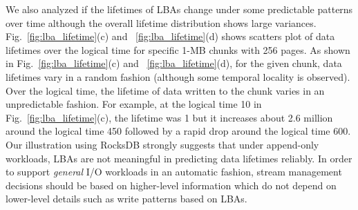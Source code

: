 We also analyzed 
if the lifetimes of LBAs change under some predictable patterns over time 
although the overall lifetime distribution shows large variances.
Fig.~\ref{fig:lba_lifetime}(c) and ~\ref{fig:lba_lifetime}(d) shows
scatters plot of data lifetimes over the logical time 
for specific 1-MB chunks with 256 pages. 
As shown in Fig.~\ref{fig:lba_lifetime}(c) and ~\ref{fig:lba_lifetime}(d), 
for the given chunk, data lifetimes vary in a random fashion
(although some temporal locality is observed).
Over the logical time, the lifetime of data written to the chunk 
varies in an unpredictable fashion.  
For example, at the logical time 10 in Fig.~\ref{fig:lba_lifetime}(c), 
the lifetime was 1 but it increases about 
2.6 million around the logical time 450 
followed by a rapid drop around the logical time 600. 
Our illustration using RocksDB strongly suggests that under append-only workloads, 
LBAs are not meaningful in predicting data lifetimes reliably.
In order to support {\it general} I/O workloads in an automatic fashion, stream 
management decisions should be based on higher-level information
which do not depend on lower-level details such as write patterns based on LBAs.

